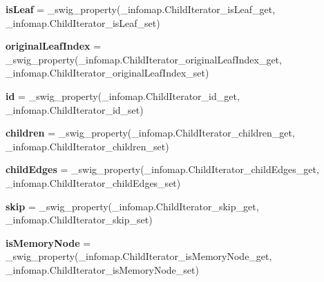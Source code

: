 \begin{DoxyCompactItemize}
{\bfseries is\+Leaf} = \+\_\+swig\+\_\+property(\+\_\+infomap.\+Child\+Iterator\+\_\+is\+Leaf\+\_\+get, \+\_\+infomap.\+Child\+Iterator\+\_\+is\+Leaf\+\_\+set)
\item 
\mbox{\label{classdsmacc_1_1graph_1_1infomap_1_1infomap_1_1ChildIterator_ad4eca874259639a9d3e68dba9419396e}} 
{\bfseries original\+Leaf\+Index} = \+\_\+swig\+\_\+property(\+\_\+infomap.\+Child\+Iterator\+\_\+original\+Leaf\+Index\+\_\+get, \+\_\+infomap.\+Child\+Iterator\+\_\+original\+Leaf\+Index\+\_\+set)
\item 
\mbox{\label{classdsmacc_1_1graph_1_1infomap_1_1infomap_1_1ChildIterator_a837e472073c6619d10f2c9338838c7c4}} 
{\bfseries id} = \+\_\+swig\+\_\+property(\+\_\+infomap.\+Child\+Iterator\+\_\+id\+\_\+get, \+\_\+infomap.\+Child\+Iterator\+\_\+id\+\_\+set)
\item 
\mbox{\label{classdsmacc_1_1graph_1_1infomap_1_1infomap_1_1ChildIterator_a579271e6ad792f270bd203954ba8b651}} 
{\bfseries children} = \+\_\+swig\+\_\+property(\+\_\+infomap.\+Child\+Iterator\+\_\+children\+\_\+get, \+\_\+infomap.\+Child\+Iterator\+\_\+children\+\_\+set)
\item 
\mbox{\label{classdsmacc_1_1graph_1_1infomap_1_1infomap_1_1ChildIterator_a3ca5076bec0d63cd3d7b33e8f5575b4a}} 
{\bfseries child\+Edges} = \+\_\+swig\+\_\+property(\+\_\+infomap.\+Child\+Iterator\+\_\+child\+Edges\+\_\+get, \+\_\+infomap.\+Child\+Iterator\+\_\+child\+Edges\+\_\+set)
\item 
\mbox{\label{classdsmacc_1_1graph_1_1infomap_1_1infomap_1_1ChildIterator_a9e0dae330521222f5fd24faa833b6995}} 
{\bfseries skip} = \+\_\+swig\+\_\+property(\+\_\+infomap.\+Child\+Iterator\+\_\+skip\+\_\+get, \+\_\+infomap.\+Child\+Iterator\+\_\+skip\+\_\+set)
\item 
\mbox{\label{classdsmacc_1_1graph_1_1infomap_1_1infomap_1_1ChildIterator_ace4dd0e139cd23406833c5f2de8d4694}} 
{\bfseries is\+Memory\+Node} = \+\_\+swig\+\_\+property(\+\_\+infomap.\+Child\+Iterator\+\_\+is\+Memory\+Node\+\_\+get, \+\_\+infomap.\+Child\+Iterator\+\_\+is\+Memory\+Node\+\_\+set)

\end{DoxyCompactItemize}
